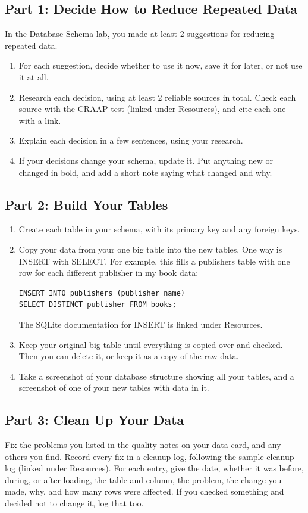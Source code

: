\documentclass[12pt]{article}
\begin{document}
\subsection*{Part 1: Decide How to Reduce Repeated Data}
In the Database Schema lab, you made at least 2 suggestions for reducing repeated data.
\begin{enumerate}
    \item For each suggestion, decide whether to use it now, save it for later, or not use it at all.
    \item Research each decision, using at least 2 reliable sources in total. Check each source with the CRAAP test (linked under Resources), and cite each one with a link.
    \item Explain each decision in a few sentences, using your research.
    \item If your decisions change your schema, update it. Put anything new or changed in bold, and add a short note saying what changed and why.
\end{enumerate}

\subsection*{Part 2: Build Your Tables}
\begin{enumerate}
    \item Create each table in your schema, with its primary key and any foreign keys.
    \item Copy your data from your one big table into the new tables. One way is INSERT with SELECT. For example, this fills a publishers table with one row for each different publisher in my book data:
\begin{Verbatim}
INSERT INTO publishers (publisher_name)
SELECT DISTINCT publisher FROM books;
\end{Verbatim}
    The SQLite documentation for INSERT is linked under Resources.
    \item Keep your original big table until everything is copied over and checked. Then you can delete it, or keep it as a copy of the raw data.
    \item Take a screenshot of your database structure showing all your tables, and a screenshot of one of your new tables with data in it.
\end{enumerate}

\subsection*{Part 3: Clean Up Your Data}
Fix the problems you listed in the quality notes on your data card, and any others you find. Record every fix in a cleanup log, following the sample cleanup log (linked under Resources). For each entry, give the date, whether it was before, during, or after loading, the table and column, the problem, the change you made, why, and how many rows were affected. If you checked something and decided not to change it, log that too.
\end{document}
